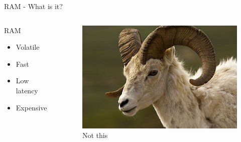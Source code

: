 \begin{frame}{RAM - What is it?}
\begin{columns}
    \begin{column}{0.47\textwidth}
    \begin{block}{RAM}
        \begin{itemize}
            \item Volatile 
            \item Fast
            \item Low latency
            \item Expensive
        \end{itemize}
    \end{block}
    \end{column}
    \begin{column}{0.47\textwidth}
        \begin{figure}
        \centering
        \includegraphics[width=\textwidth]{img/ram.jpg}
        \caption{Not this}
        \label{fig:my_label}
    \end{figure}
    \end{column}
\end{columns}
\end{frame}

